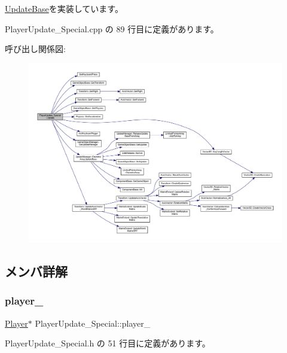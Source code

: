 \mbox{\hyperlink{class_update_base_a9fdc8924001cf6fa89c1f5fa0d867682}{Update\+Base}}を実装しています。



 Player\+Update\+\_\+\+Special.\+cpp の 89 行目に定義があります。

呼び出し関係図\+:\nopagebreak
\begin{figure}[H]
\begin{center}
\leavevmode
\includegraphics[width=350pt]{class_player_update___special_afef3503e292dbaded809068fd87deadd_cgraph}
\end{center}
\end{figure}


\subsection{メンバ詳解}
\mbox{\label{class_player_update___special_adbf3a64a60324cc274e2084bbeef04c9}} 
\subsubsection{\texorpdfstring{player\+\_\+}{player\_}}
{\footnotesize\ttfamily \mbox{\hyperlink{class_player}{Player}}$\ast$ Player\+Update\+\_\+\+Special\+::player\+\_\+\hspace{0.3cm}{\ttfamily [private]}}



 Player\+Update\+\_\+\+Special.\+h の 51 行目に定義があります。

